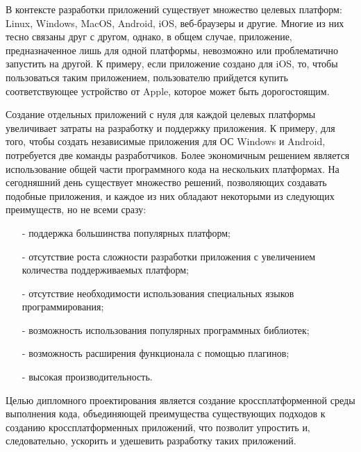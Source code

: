 В контексте разработки приложений существует множество целевых платформ: Linux, Windows, MacOS, Android, iOS, веб-браузеры и другие.
Многие из них тесно связаны друг с другом, однако, в общем случае, приложение, предназначенное лишь для одной платформы, невозможно или проблематично запустить на другой.
К примеру, если приложение создано для iOS, то, чтобы пользоваться таким приложением, пользователю прийдется купить соответствующее устройство от Apple, которое может быть дорогостоящим.

Создание отдельных приложений с нуля для каждой целевых платформы увеличивает затраты на разработку и поддержку приложения. 
К примеру, для того, чтобы создать независимые приложения для ОС Windows и Android, потребуется две команды разработчиков.
Более экономичным решением является использование общей части программного кода на нескольких платформах.
На сегодняшний день существует множество решений, позволяющих создавать подобные приложения, и каждое из них обладают некоторыми из следующих преимуществ, но не всеми сразу:
\begin{itemize}
    \item[-] поддержка большинства популярных платформ;
    \item[-] отсутствие роста сложности разработки приложения с увеличением количества поддерживаемых платформ;
    \item[-] отсутствие необходимости использования специальных языков программирования;
    \item[-] возможность использования популярных программных библиотек;
    \item[-] возможность расширения функционала с помощью плагинов;
    \item[-] высокая производительность.
\end{itemize}

Целью дипломного проектирования является создание кроссплатформенной среды выполнения кода, объединяющей преимущества существующих подходов к созданию кроссплатформенных приложений, что позволит упростить и, следовательно, ускорить и удешевить разработку таких приложений.
